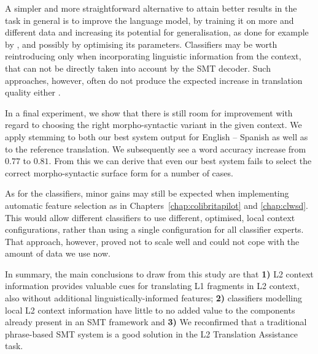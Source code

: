 A simpler and more straightforward alternative to attain better results in the
task in general is to improve the language model, by training it on more and
different data and increasing its potential for generalisation, as done for
example by \cite{UEDIN}, and possibly by optimising its parameters.
Classifiers may be worth reintroducing only when incorporating linguistic
information from the context, that can not be directly taken into account by
the SMT decoder. Such approaches, however, often do not produce the expected
increase in translation quality either \citep{UNAL, IUCL}. 

In a final experiment, we show that there is still room for improvement
with regard to choosing the right morpho-syntactic variant in the given
context. We apply stemming to both our best system
output for English -- Spanish as well as to the reference translation. We
subsequently see a word accuracy increase from $0.77$ to $0.81$. From this we can derive that
even our best system fails to select the correct morpho-syntactic surface form for a
number of cases.

As for the classifiers, minor gains may still be expected when implementing
automatic feature selection  as in Chapters~\ref{chap:colibritapilot} and
\ref{chap:clwsd}. This would allow different classifiers to use different,
optimised, local context configurations, rather than using a single
configuration for all classifier experts. That approach, however, proved not to
scale well and could not cope with the amount of data we use now. 

In summary, the main conclusions to draw from this study are that \textbf{1)}
L2 context information provides valuable cues for translating L1 fragments in
L2 context, also without additional linguistically-informed features;
\textbf{2)} classifiers modelling local L2 context information have little to
no added value to the components already present in an SMT framework and
\textbf{3)} We reconfirmed that a traditional phrase-based SMT system is a good
solution in the L2 Translation Assistance task.


